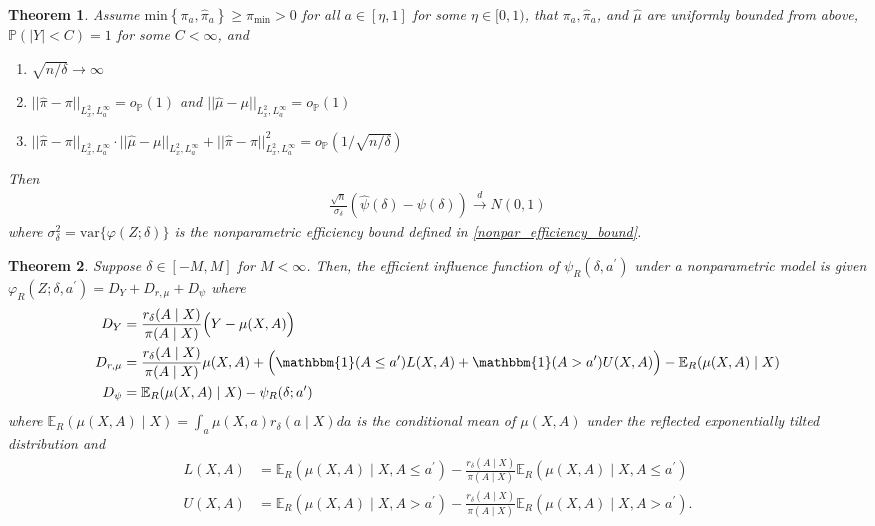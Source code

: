 \documentclass[10pt,a4paper]{amsart}
\newtheorem{theorem}{Theorem}
\newcommand{\var}{\text{var}}
\begin{document}
\begin{theorem} \label{asymptotic_normality}
Assume $\text{min}\left\{ \pi_a, \widehat{\pi}_a \right\} \geq \pi_{\min} >0$ for all $a \in  [\eta, 1]$ for some $\eta \in [0, 1)$,  that $\pi_a, \widehat{\pi}_a$, and $\widehat{\mu}$ are uniformly bounded from above, $\mathbb{P}(|Y| < C) = 1$ for some $C < \infty$, and
\begin{enumerate}
    \item[(i)] $\sqrt{n / \delta} \to \infty$
    \item[(ii)] $ || \widehat{\pi} - \pi||_{L^2_x, L^\infty_a} = o_{\mathbb{P}}(1)$ and  $ || \widehat{\mu} - \mu ||_{L^2_x, L^\infty_a} =  o_{\mathbb{P}}(1)$
    \item[(iii)] $ || \widehat{\pi} - \pi||_{L^2_x, L^\infty_a} \cdot   || \widehat{\mu} - \mu ||_{L^2_x, L^\infty_a}  +  || \widehat{\pi} - \pi||^2_{L^2_x, L^\infty_a} = o_{\mathbb{P}}\left(1 / \sqrt{n / \delta}\right)$
\end{enumerate}
Then 
\begin{align*}
    \frac{\sqrt{n}}{\sigma_\delta}\left(\widehat{\psi}(\delta) - \psi(\delta)\right)\overset{d}{\longrightarrow}N(0,1)
\end{align*}
where $\sigma^2_\delta = \var\{\varphi(Z;\delta)\}$ is the nonparametric efficiency bound defined in \cref{nonpar_efficiency_bound}.
\end{theorem}

\begin{theorem} \label{reflected_eif}
    Suppose $\delta \in [-M,M]$ for $M<\infty$. Then, the efficient influence function of $\psi_R(\delta, a^\prime)$ under a nonparametric model is given $\varphi_R(Z;\delta, a^\prime) = D_Y + D_{r, \mu} + D_\psi$ where
\begin{align*}
    D_Y &= \frac{r_\delta(A \mid X)}{\pi(A \mid X)} \Big(Y - \mu(X, A) \Big) \\
    D_{r, \mu} &= \frac{r_\delta(A \mid X)}{\pi(A \mid X)} \mu(X, A) + \Big(\mathbbm{1}(A \leq a^\prime)L(X, A) + \mathbbm{1}(A > a^\prime) U(X, A) \Big) - \mathbb{E}_R(\mu(X, A) \mid X) \\
    D_\psi &= \mathbb{E}_R(\mu(X, A) \mid X)  - \psi_R(\delta; a^\prime)
\end{align*}
where $\mathbb{E}_R(\mu(X, A) \mid X) = \int_a \mu(X, a) r_\delta(a \mid X) da$ is the conditional mean of $\mu(X, A)$ under the reflected exponentially tilted distribution and
\begin{align*}
    L(X, A) &= \mathbb{E}_R(\mu(X, A) \mid X, A \leq a^\prime) - \frac{r_\delta(A \mid X)}{\pi(A \mid X)} \mathbb{E}_R(\mu(X, A) \mid X, A \leq a^\prime) \\
    U(X, A) &= \mathbb{E}_R(\mu(X, A) \mid X, A > a^\prime) - \frac{r_\delta(A \mid X)}{\pi(A \mid X)} \mathbb{E}_R(\mu(X, A) \mid X, A > a^\prime).
\end{align*}
\end{theorem}
\end{document}
